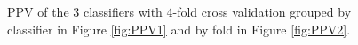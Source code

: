 \documentclass[11pt]{article}
\begin{document}
	
	
	
	

	
	
	\begin{figure}[H]%
		\centering
		\caption{\footnotesize PPV of the 3 classifiers with 4-fold cross validation grouped by classifier in Figure \ref{fig:PPV1}  and  by fold in Figure \ref{fig:PPV2}. }
		\label{fig:RealPPV}
	\end{figure}
	
\end{document}
